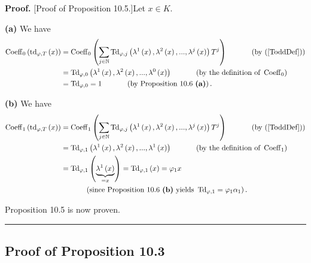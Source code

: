 \documentclass[numbers=enddot,12pt,final,onecolumn,notitlepage]{scrartcl}%
\newenvironment{proof}[1][Proof]{\noindent\textbf{#1.} }{\ \rule{0.5em}{0.5em}}
\begin{document}
\begin{proof}
[Proof of Proposition 10.5.]Let $x\in K$.

\textbf{(a)} We have%
\begin{align*}
\operatorname*{Coeff}\nolimits_{0}\left(  \operatorname*{td}\nolimits_{\varphi
,T}\left(  x\right)  \right)   &  =\operatorname*{Coeff}\nolimits_{0}\left(
\sum_{j\in\mathbb{N}}\operatorname*{Td}\nolimits_{\varphi,j}\left(
\lambda^{1}\left(  x\right)  ,\lambda^{2}\left(  x\right)  ,...,\lambda
^{j}\left(  x\right)  \right)  T^{j}\right)  \ \ \ \ \ \ \ \ \ \ \left(
\text{by (\ref{ToddDef})}\right) \\
&  =\operatorname*{Td}\nolimits_{\varphi,0}\left(  \lambda^{1}\left(
x\right)  ,\lambda^{2}\left(  x\right)  ,...,\lambda^{0}\left(  x\right)
\right)  \ \ \ \ \ \ \ \ \ \ \left(  \text{by the definition of }%
\operatorname*{Coeff}\nolimits_{0}\right) \\
&  =\operatorname*{Td}\nolimits_{\varphi,0}=1\ \ \ \ \ \ \ \ \ \ \left(
\text{by Proposition 10.6 \textbf{(a)}}\right)  .
\end{align*}


\textbf{(b)} We have%
\begin{align*}
\operatorname*{Coeff}\nolimits_{1}\left(  \operatorname*{td}\nolimits_{\varphi
,T}\left(  x\right)  \right)   &  =\operatorname*{Coeff}\nolimits_{1}\left(
\sum_{j\in\mathbb{N}}\operatorname*{Td}\nolimits_{\varphi,j}\left(
\lambda^{1}\left(  x\right)  ,\lambda^{2}\left(  x\right)  ,...,\lambda
^{j}\left(  x\right)  \right)  T^{j}\right)  \ \ \ \ \ \ \ \ \ \ \left(
\text{by (\ref{ToddDef})}\right) \\
&  =\operatorname*{Td}\nolimits_{\varphi,1}\left(  \lambda^{1}\left(
x\right)  ,\lambda^{2}\left(  x\right)  ,...,\lambda^{1}\left(  x\right)
\right)  \ \ \ \ \ \ \ \ \ \ \left(  \text{by the definition of }%
\operatorname*{Coeff}\nolimits_{1}\right) \\
&  =\operatorname*{Td}\nolimits_{\varphi,1}\left(  \underbrace{\lambda
^{1}\left(  x\right)  }_{=x}\right)  =\operatorname*{Td}\nolimits_{\varphi
,1}\left(  x\right)  =\varphi_{1}x\\
&  \ \ \ \ \ \ \ \ \ \ \left(  \text{since Proposition 10.6 \textbf{(b)}
yields }\operatorname*{Td}\nolimits_{\varphi,1}=\varphi_{1}\alpha_{1}\right)
.
\end{align*}


Proposition 10.5 is now proven.
\end{proof}

\subsection{Proof of Proposition 10.3}
\end{document}
